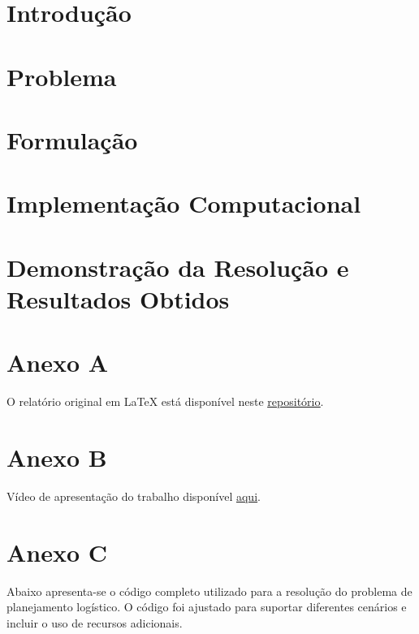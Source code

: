 \documentclass[12pt,a4paper,final]{article}
\begin{document}
    \section{Introdução}\label{sec:introducao}
    


    \section{Problema}\label{sec:problema}
    


    \section{Formulação}\label{sec:formulacao}
    


    \section{Implementação Computacional}\label{sec:implementacao-computacional}
    


    \section{Demonstração da Resolução e Resultados Obtidos}\label{sec:demonstracao-da-resolucao-e-resultados-obtidos}
    
    \newpage
    \appendix
    \section*{Anexo A}
    O relatório original em LaTeX está disponível neste \underline{\href{https://github.com/2100562/RelatorioIO}{repositório}}.

    \section*{Anexo B}
    Vídeo de apresentação do trabalho disponível \underline{\href{https://uabpt-my.sharepoint.com/:v:/g/personal/2100562_estudante_uab_pt/Eftz7VNy2aRGvoZk7G__rzEBpxJSsLZQq_2CU1UrSz5xWA?e=2g3iH6&isSPOFile=1}{aqui}}.

    \section*{Anexo C}

    Abaixo apresenta-se o código completo utilizado para a resolução do problema de planejamento logístico. O código foi ajustado para suportar diferentes cenários e incluir o uso de recursos adicionais.
\end{document}
